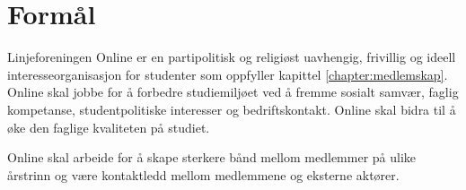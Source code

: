 \chapter{Formål}

Linjeforeningen Online er en partipolitisk og religiøst uavhengig, frivillig og ideell interesseorganisasjon for studenter som oppfyller kapittel  \ref{chapter:medlemskap}. Online skal jobbe for å forbedre studiemiljøet ved å fremme sosialt samvær, faglig kompetanse, studentpolitiske interesser og bedriftskontakt. Online skal bidra til å øke den faglige kvaliteten på studiet.

Online skal arbeide for å skape sterkere bånd mellom medlemmer på ulike årstrinn og være kontaktledd mellom medlemmene og eksterne aktører. 
